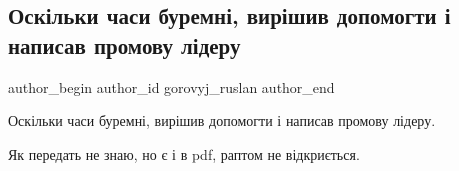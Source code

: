  
 
 
 
 
 
\subsection{Оскільки часи буремні, вирішив допомогти і написав промову лідеру}
\label{sec:13_02_2022.fb.gorovyj_ruslan.1.promova_lideru}
 
\ifcmt
 author_begin
   author_id gorovyj_ruslan
 author_end
\fi

Оскільки часи буремні, вирішив допомогти і написав промову лідеру.

Як передать не знаю, но є і в pdf, раптом не відкриється.

